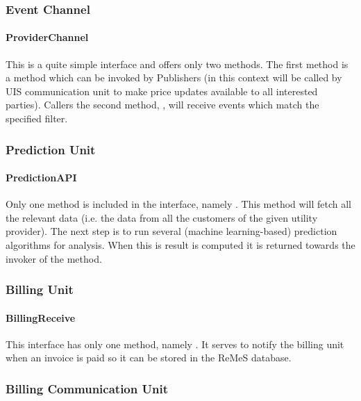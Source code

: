 \subsubsection{Event Channel}

\paragraph{ProviderChannel}
\npar This is a quite simple interface and offers only two methods. The first
method is a  method which can be invoked by
Publishers (in this context  will be called by UIS communication
unit to make price updates available to all interested parties). Callers the
second method, , will receive events which
match the specified filter.

\subsubsection{Prediction Unit}

\paragraph{PredictionAPI}

\npar Only one method is included in the  interface,
namely . This
method will fetch all the relevant data (i.e. the data from all the customers of
the given utility provider). The next step is to run several (machine
learning-based) prediction algorithms for analysis. When this is result is
computed it is returned towards the invoker of the method.

\subsubsection{Billing Unit}

\paragraph{BillingReceive}

\npar This interface has only one method, namely . It serves to notify the billing unit when an invoice is paid so
it can be stored in the ReMeS database.

\subsubsection{Billing Communication Unit}

